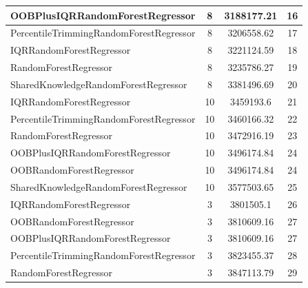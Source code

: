 \begin{table}[h]
\begin{tabular}{|l|c|c|c|}
\textcolor[HTML]{ede15b}{OOBPlusIQRRandomForestRegressor} & 8 & 3188177.21 & 16 \\ \hline
\textcolor[HTML]{f46a9b}{PercentileTrimmingRandomForestRegressor} & 8 & 3206558.62 & 17 \\ \hline
\textcolor[HTML]{27aeef}{IQRRandomForestRegressor} & 8 & 3221124.59 & 18 \\ \hline
\textcolor[HTML]{87bc45}{RandomForestRegressor} & 8 & 3235786.27 & 19 \\ \hline
\textcolor[HTML]{ef9b20}{SharedKnowledgeRandomForestRegressor} & 8 & 3381496.69 & 20 \\ \hline
\textcolor[HTML]{27aeef}{IQRRandomForestRegressor} & 10 & 3459193.6 & 21 \\ \hline
\textcolor[HTML]{f46a9b}{PercentileTrimmingRandomForestRegressor} & 10 & 3460166.32 & 22 \\ \hline
\textcolor[HTML]{87bc45}{RandomForestRegressor} & 10 & 3472916.19 & 23 \\ \hline
\textcolor[HTML]{ede15b}{OOBPlusIQRRandomForestRegressor} & 10 & 3496174.84 & 24 \\ \hline
\textcolor[HTML]{b33dc6}{OOBRandomForestRegressor} & 10 & 3496174.84 & 24 \\ \hline
\textcolor[HTML]{ef9b20}{SharedKnowledgeRandomForestRegressor} & 10 & 3577503.65 & 25 \\ \hline
\textcolor[HTML]{27aeef}{IQRRandomForestRegressor} & 3 & 3801505.1 & 26 \\ \hline
\textcolor[HTML]{b33dc6}{OOBRandomForestRegressor} & 3 & 3810609.16 & 27 \\ \hline
\textcolor[HTML]{ede15b}{OOBPlusIQRRandomForestRegressor} & 3 & 3810609.16 & 27 \\ \hline
\textcolor[HTML]{f46a9b}{PercentileTrimmingRandomForestRegressor} & 3 & 3823455.37 & 28 \\ \hline
\textcolor[HTML]{87bc45}{RandomForestRegressor} & 3 & 3847113.79 & 29 \\ \hline
\end{tabular}
\end{table}

